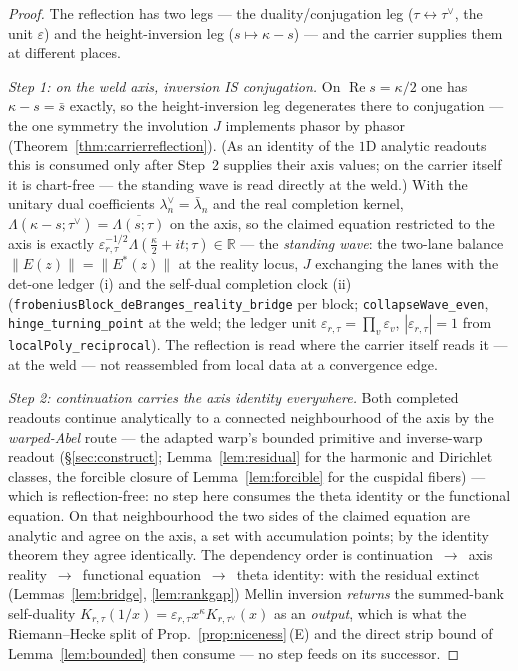 \documentclass[11pt]{article}
\theoremstyle{definition}
\renewcommand{\Re}{\operatorname{Re}}
\begin{document}
\begin{proof}
The reflection has two legs --- the duality/conjugation leg ($\tau\leftrightarrow\tau^\vee$, the unit
$\varepsilon$) and the height-inversion leg ($s\mapsto\kappa-s$) --- and the carrier supplies them at
different places.

\emph{Step 1: on the weld axis, inversion IS conjugation.} On $\Re s=\kappa/2$ one has $\kappa-s=\bar s$
exactly, so the height-inversion leg degenerates there to conjugation --- the one symmetry the involution $J$
implements phasor by phasor (Theorem~\ref{thm:carrierreflection}). (As an identity of the $1$D analytic
readouts this is consumed only after Step~2 supplies their axis values; on the carrier itself it is chart-free
--- the standing wave is read directly at the weld.) With the unitary dual coefficients
$\lambda_n^{\vee}=\bar\lambda_n$ and the real completion kernel,
$\Lambda(\kappa-s;\tau^\vee)=\overline{\Lambda(s;\tau)}$ on the axis, so the claimed equation restricted to
the axis is exactly $\varepsilon_{r,\tau}^{-1/2}\Lambda(\tfrac\kappa2+it;\tau)\in\mathbb R$ --- the
\emph{standing wave}: the two-lane balance $\|E(z)\|=\|E^{*}(z)\|$ at the reality locus, $J$ exchanging the
lanes with the det-one ledger \textup{(i)} and the self-dual completion clock \textup{(ii)}
(\texttt{frobeniusBlock\_deBranges\_reality\_bridge} per block; \texttt{collapseWave\_even},
\texttt{hinge\_turning\_point} at the weld; the ledger unit $\varepsilon_{r,\tau}=\prod_v\varepsilon_v$,
$|\varepsilon_{r,\tau}|=1$ from \texttt{localPoly\_reciprocal}). The reflection is read where the carrier
itself reads it --- at the weld --- not reassembled from local data at a convergence edge.

\emph{Step 2: continuation carries the axis identity everywhere.} Both completed readouts continue
analytically to a connected neighbourhood of the axis by the \emph{warped-Abel} route --- the adapted warp's
bounded primitive and inverse-warp readout (\S\ref{sec:construct}; Lemma~\ref{lem:residual} for the harmonic
and Dirichlet classes, the forcible closure of Lemma~\ref{lem:forcible} for the cuspidal fibers) --- which is
reflection-free: no step here consumes the theta identity or the functional equation. On that neighbourhood
the two sides of the claimed equation are analytic and agree on the axis, a set with accumulation points; by
the identity theorem they agree identically. The dependency order is
continuation~$\to$~axis reality~$\to$~functional equation~$\to$~theta identity: with the residual extinct
(Lemmas~\ref{lem:bridge}, \ref{lem:rankgap}) Mellin inversion \emph{returns} the summed-bank self-duality
$K_{r,\tau}(1/x)=\varepsilon_{r,\tau}x^{\kappa}K_{r,\tau^\vee}(x)$ as an \emph{output}, which is what the
Riemann--Hecke split of Prop.~\ref{prop:niceness}\,(E) and the direct strip bound of Lemma~\ref{lem:bounded}
then consume --- no step feeds on its successor.


\end{proof}
\end{document}
